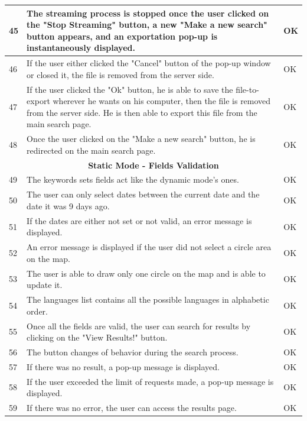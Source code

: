 \documentclass[a4paper,11pt]{report}
\begin{document}
\begin{center}
\begin{longtable}{|l|p{10cm}|p{4.4cm}|}
	45 & The streaming process is stopped once the user clicked on the "Stop Streaming" button, a new "Make a new search" button appears, and an exportation pop-up is instantaneously displayed. & \color{ForestGreen}OK\color{black}\\\hline
	46 & If the user either clicked the "Cancel" button of the pop-up window or closed it, the file is removed from the server side. & \color{ForestGreen}OK\color{black}\\\hline
	47 & If the user clicked the "Ok" button, he is able to save the file-to-export wherever he wants on his computer, then the file is removed from the server side. He is then able to export this file from the main search page. & \color{ForestGreen}OK\color{black}\\\hline
	48 & Once the user clicked on the "Make a new search" button, he is redirected on the main search page. & \color{ForestGreen}OK\color{black}\\\hline
	 
	\multicolumn{3}{|c|}{\textbf{Static Mode - Fields Validation}}\\\hline
	49 & The keywords sets fields act like the dynamic mode's ones. & \color{ForestGreen}OK\color{black}\\\hline
	50 & The user can only select dates between the current date and the date it was 9 days ago. & \color{ForestGreen}OK\color{black}\\\hline
	51 & If the dates are either not set or not valid, an error message is displayed. & \color{ForestGreen}OK\color{black}\\\hline
	52 & An error message is displayed if the user did not select a circle area on the map. & \color{ForestGreen}OK\color{black}\\\hline
	53 & The user is able to draw only one circle on the map and is able to update it. & \color{ForestGreen}OK\color{black}\\\hline
	54 & The languages list contains all the possible languages in alphabetic order. & \color{ForestGreen}OK\color{black}\\\hline
	55 & Once all the fields are valid, the user can search for results by clicking on the "View Results!" button. & \color{ForestGreen}OK\color{black}\\\hline
	56 & The button changes of behavior during the search process. & \color{ForestGreen}OK\color{black}\\\hline
	57 & If there was no result, a pop-up message is displayed. & \color{ForestGreen}OK\color{black}\\\hline
	58 & If the user exceeded the limit of requests made, a pop-up message is displayed. & \color{ForestGreen}OK\color{black}\\\hline
	59 & If there was no error, the user can access the results page. & \color{ForestGreen}OK\color{black}\\\hline
	 

\end{longtable}
\end{center}
\end{document}
